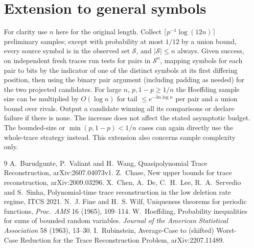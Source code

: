 \documentclass[11pt]{article}
\begin{document}
\section*{Extension to general symbols} For clarity use $n$
here for the original length. Collect $\lceil p^{-1}\log(12n)\rceil$
preliminary samples; except with probability at most $1/12$ by a union
bound, every source symbol is in the observed set $\mathcal S$, and
$|\mathcal S|\le n$ always. Given success, on independent fresh traces
run tests for pairs in $\mathcal S^n$, mapping symbols for each pair to bits by
the indicator of one of the distinct symbols at its first differing position,
then using the binary pair argument (including padding as needed) for the two
projected candidates. For large $n$, $p,1-p\ge1/n$ the Hoeffding sample size can
be multiplied by $O(\log n)$ for tail $\le e^{-3n\log n}$ per pair and a
union bound over rivals. Output a candidate winning all its comparisons or
declare failure if there is none. The increase does not affect the stated asymptotic
budget. The bounded-size or $\min(p,1-p)<1/n$ cases can again directly use the
whole-trace strategy instead. This extension also concerns sample complexity
only.

\begin{thebibliography}{9}
A.~Burudgunte, P.~Valiant and H.~Wang, Quasipolynomial Trace Reconstruction, arXiv:2607.04073v1.
Z.~Chase, New upper bounds for trace reconstruction, arXiv:2009.03296.
X.~Chen, A.~De, C.~H.~Lee, R.~A.~Servedio and S.~Sinha,
Polynomial-time trace reconstruction in the low deletion rate regime,
ITCS 2021.
N.~J. Fine and H.~S. Wilf, Uniqueness theorems for periodic functions, \emph{Proc.\ AMS} 16 (1965), 109--114.
W.~Hoeffding,
Probability inequalities for sums of bounded random variables.
\emph{Journal of the American Statistical Association} 58 (1963), 13--30.
I.~Rubinstein, Average-Case to (shifted) Worst-Case Reduction for the Trace Reconstruction Problem, arXiv:2207.11489.
\end{thebibliography}
\end{document}
